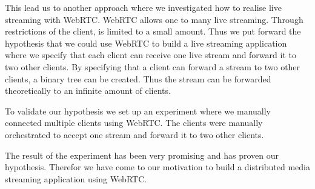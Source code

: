 This lead us to another approach where we investigated how to realise live streaming with WebRTC. WebRTC allows one to many live streaming. Through restrictions of the client,  is limited to a small amount. Thus we put forward the hypothesis that we could use WebRTC to build a live streaming application where we specify that each client can receive one live stream and forward it to two other clients. By specifying that a client can forward a stream to two other clients, a binary tree can be created. Thus the stream can be forwarded theoretically to an infinite amount of clients. 

To validate our hypothesis we set up an experiment where we manually connected multiple clients using WebRTC. The clients were manually orchestrated to accept one stream and forward it to two other clients. 

The result of the experiment has been very promising and has proven our hypothesis. Therefor we have come to our motivation to build a distributed media streaming application using WebRTC. 


